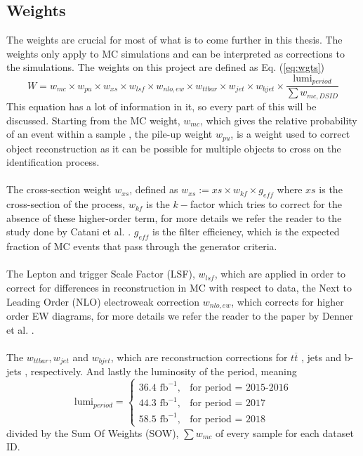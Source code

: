 \documentclass[12pt, a4paper]{book}
\begin{document}
\subsection{Weights}\label{sec:wgts}
The weights are crucial for most of what is to come further in this thesis. The weights only apply to MC simulations and can be interpreted as corrections to the simulations. The weights on this project are defined as Eq. (\ref{eq:wgts})
\begin{equation}\label{eq:wgts}
   W = w_{mc}\times w_{pu}\times w_{xs}\times w_{lsf} \times w_{nlo,ew} \times w_{ttbar} \times w_{jet} \times w_{bjet} \times \frac{\text{lumi}_{period}}{\sum w_{mc, DSID}}
\end{equation}
This equation has a lot of information in it, so every part of this will be discussed. Starting from the MC weight, $w_{mc}$, which gives the relative probability of an event within a sample \cite{Pythia}, the pile-up weight $w_{pu}$, is a weight used to correct object reconstruction as it can be possible for multiple objects to cross on the 
identification process. \cite{Soyez:2018opl}\\ 
\\The cross-section weight $w_{xs}$, defined as $w_{xs} := xs \times w_{kf} \times g_{eff}$ where $xs$ is the cross-section of the process, $w_{kf}$ is the $k-$factor which tries to correct for the absence of these higher-order term, 
for more details we refer the reader to the study done by Catani et al. \cite{Catani:2001cr}. $g_{eff}$ is the filter efficiency, which is the expected fraction of MC events that pass through the generator criteria.\\
\\The Lepton and trigger Scale Factor (LSF), $w_{lsf}$, which are applied in order to correct for differences in reconstruction in MC with respect to data, the Next to Leading Order (NLO) electroweak correction $w_{nlo,ew}$, which corrects for higher order EW diagrams, 
for more details we refer the reader to the paper by Denner et al. \cite{Denner:2022pwc}. \\
\\The $w_{ttbar}, w_{jet}$ and $w_{bjet}$, which are reconstruction corrections for $t\overline{t}$ \cite{Czakon:2015owf}, jets \cite{ATLAS:2014hvo} and b-jets \cite{ATLAS:2019bwq}, respectively. And lastly the luminosity of the period, meaning
$$
\text{lumi}_{period} = \begin{cases}
               36.4\text{ fb}^{-1},& \text{for period = 2015-2016}\\
               44.3\text{ fb}^{-1},& \text{for  period = 2017}\\
               58.5\text{ fb}^{-1},& \text{for  period = 2018}
               \end{cases}
$$
divided by the Sum Of Weights (SOW), $\sum w_{mc}$ of every sample for each dataset ID.
\end{document}
